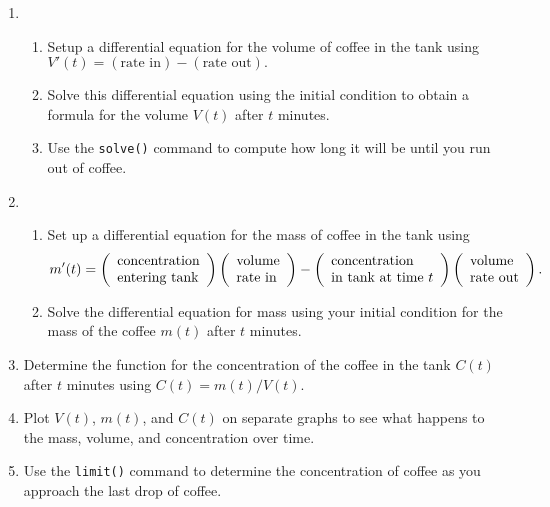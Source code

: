 \begin{enumerate}
\item 
\begin{enumerate}
    \item Setup a differential equation for the volume of coffee in the tank using $V'(t) = (\text{rate in}) - (\text{rate out}).$
    \item Solve this differential equation using the initial condition to obtain a formula for the volume $V(t)$ after $t$ minutes.
    \item Use the \texttt{solve()} command to compute how long it will be until you run out of coffee.
\end{enumerate}
\item 
\begin{enumerate}
    \item Set up a differential equation for the mass of coffee in the tank using 
    \[m'(t) = \left(\begin{array}{l}
         \text{concentration}  \\
         \text{entering tank} 
    \end{array}\right)
    \left(\begin{array}{l}
         \text{volume}  \\
         \text{rate in} 
    \end{array}\right)
    -
    \left(\begin{array}{l}
         \text{concentration}  \\
         \text{in tank at time }t 
    \end{array}\right)
    \left(\begin{array}{l}
         \text{volume}  \\
         \text{rate out} 
    \end{array}\right).\]
    \item Solve the differential equation for mass using your initial condition for the mass of the coffee $m(t)$ after $t$ minutes.
\end{enumerate}
\item Determine the function for the concentration of the coffee in the tank $C(t)$ after $t$ minutes using $C(t) = m(t)/V(t)$.
\item Plot $V(t)$, $m(t)$, and $C(t)$ on separate graphs to see what happens to the mass, volume, and concentration over time.
\item Use the \texttt{limit()} command to determine the concentration of coffee as you approach the last drop of coffee.
\end{enumerate}